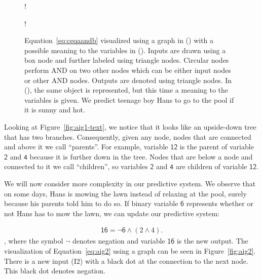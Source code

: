 \begin{figure}[!htb]
    \centering
  \begin{minipage}[b]{.3\linewidth}
    \centering
    \resizebox {0.63\textwidth} {!} {
      
    }
    \label{fig:aig1-num}
  \end{minipage}
  \begin{minipage}[b]{.5\linewidth}
    \centering
    \resizebox {0.5\textwidth} {!} {
      
    }
    \label{fig:aig1-text}
  \end{minipage}
\caption{Equation~\ref{eq:ceqaandb} visualized using a graph in () with a possible meaning to the variables in (). Inputs are drawn using a box node and further labeled using triangle nodes. Circular nodes perform AND on two other nodes which can be either input nodes or other AND nodes. Outputs are denoted using triangle nodes. In (), the same object is represented, but this time a meaning to the variables is given. We predict teenage boy Hans to go to the pool if it is sunny and hot.}
\label{fig:aig1}
\end{figure}
\FloatBarrier

\noindent Looking at Figure~\ref{fig:aig1-text}, we notice that it looks like an upside-down tree that has two branches. Consequently, given any node, nodes that are connected and above it we call \enquote{parents}. For example, variable $\mathsf{12}$ is the parent of variable $\mathsf{2}$ and $\mathsf{4}$ because it is further down in the tree. Nodes that are below a node and connected to it we call \enquote{children}, so variables $\mathsf{2}$ and $\mathsf{4}$ are children of variable $\mathsf{12}$.

\noindent We will now consider more complexity in our predictive system. We observe that on some days, Hans is mowing the lawn instead of relaxing at the pool, surely because his parents told him to do so. If binary variable $\mathsf{6}$ represents whether or not Hans has to mow the lawn, we can update our predictive system:

\begin{align} \label{eq:aig2}
  \mathsf{16} = \lnot \mathsf{6} \wedge (2 \wedge 4).
\end{align}, where the symbol $\lnot$ denotes negation and variable $\mathsf{16}$ is the new output. The visualization of Equation~\ref{eq:aig2} using a graph can be seen in Figure~\ref{fig:aig2}. There is a new input (I2) with a black dot at the connection to the next node. This black dot denotes negation.

